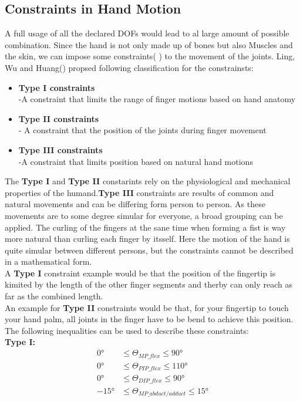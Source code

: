 \subsection{Constraints in Hand Motion}
A full usage of all the declared DOFs would lead to al large amount of possible combination. Since the hand is not only made up of bones but also Muscles and the skin, we can impose some constraints( \cite{Badler.1987}) to the movement of the joints. Ling, Wu and Huang(\cite{LIN.2000}) propsed following classification for the constrainsts:
\newpage
\begin{itemize}
\item \textbf{Type I constraints}\\
	-A constraint that limits the range of finger motions based on hand anatomy
	\item \textbf{Type II constraints}\\
	- A constraint that the position of the joints during finger movement
	\item \textbf{Type III constraints\\}
	-A constraint that limits position based on natural hand motions
\end{itemize} 
The \textbf{Type I} and \textbf{Type II} constarints rely on the physiological and mechanical properties of the humand.\textbf{Type III} constraints are results of common and natural
movements and can be differing form person to person. As these movements are to some degree simular for everyone, a broad grouping can be applied. The curling of the fingers at the sane time when forming a fist is way more natural than curling each finger by itsself. Here the motion of the hand is quite simular between different persons, but the constraints cannot be described in a mathematical form. \\
 A \textbf{Type I} constraint example would be that the position of the fingertip is kimited by the length of the other finger segments and therby can only reach as far as the combined length.\\An example for \textbf{Type II} constraints would be that, for your fingertip to touch your hand palm, all joints in the finger have to be bend to achieve this position.
The following inequalities can be used to describe these constraints:\\
\textbf{Type I:}
\begin{equation}
\begin{split}
0°&\leq \Theta _{MP\_flex} \leq 90°\\
0°&\leq \Theta _{PIP\_flex} \leq 110°\\
0°&\leq \Theta _{DIP\_flex} \leq 90°\\
-15°&\leq \Theta _{MP\_abduct/adduct} \leq 15°
\end{split}
\end{equation}
